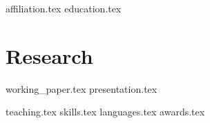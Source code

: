 \documentclass[letterpaper,12pt]{article}
\begin{document}



{affiliation.tex}
{education.tex}
\section{Research}
{working_paper.tex}
{presentation.tex}

\pagebreak

{teaching.tex}
\sidebyside
    {{skills.tex}}
    {{languages.tex}}
{awards.tex}
\end{document}
